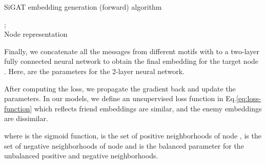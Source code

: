 \documentclass[runningheads]{llncs}
\begin{document}
\begin{algorithm}[!ht]
    \caption{SiGAT embedding generation (forward) algorithm}
    \label{alg:algorithm1}
    \begin{algorithmic}[1]
        \renewcommand{\algorithmicrequire}{\textbf{Input:}}
        \renewcommand{\algorithmicensure}{\textbf{Output:}}
        ;\\
                
            
        \ENSURE  Node representation 
        \\ 
\STATE{}
\STATE{}
\STATE{}
        \FOR{}
\FOR{}
\STATE{}
                
                \FOR{}
                    \FOR{}
                        \STATE{
                        \;
                        }
                    \ENDFOR
\STATE{
                    
                    }
                    \STATE{
                    
                    }


\ENDFOR
            \ENDFOR

            \ENDFOR
        \RETURN {}
    \end{algorithmic}
\end{algorithm}

Finally, we concatenate all the messages from different motifs with  to a two-layer fully connected neural network to obtain the final embedding  for the target node .
Here,  are the parameters for the 2-layer neural network.

After computing the loss, we propagate the gradient back and update the parameters.
In our models, we define an unsupervised loss function in Eq.\ref{eq:loss-function} which reflects friend embeddings are similar, and the enemy embeddings are dissimilar. 

where  is the sigmoid function,  is the set of positive neighborhoods of node ,  is the set of negative neighborhoods of node  and  is the balanced parameter for the unbalanced positive and negative neighborhoods.
 
\end{document}

